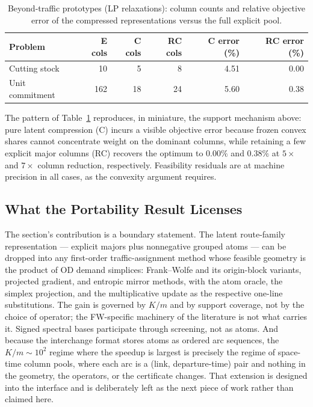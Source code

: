 \begin{table}[htbp]
\centering
\caption{Beyond-traffic prototypes (LP relaxations): column counts and
relative objective error of the compressed representations versus the full
explicit pool.}
\label{tab:beyond-traffic}
\begin{tabular}{lrrrrr}
\toprule
Problem & E cols & C cols & RC cols & C error (\%) & RC error (\%) \\
\midrule
Cutting stock   & 10  & 5  & 8  & 4.51 & 0.00 \\
Unit commitment & 162 & 18 & 24 & 5.60 & 0.38 \\
\bottomrule
\end{tabular}
\end{table}

The pattern of Table~\ref{tab:beyond-traffic} reproduces, in miniature, the
support mechanism above: pure latent
compression (C) incurs a visible objective error because frozen convex shares
cannot concentrate weight on the dominant columns, while retaining a few
explicit major columns (RC) recovers the optimum to $0.00\%$ and $0.38\%$ at
$5\times$ and $7\times$ column reduction, respectively. Feasibility residuals
are at machine precision in all cases, as the convexity argument requires.

\subsection{What the Portability Result Licenses}
\label{sec:portability-conclusions}

The section's contribution is a boundary statement. The latent
route-family representation --- explicit majors plus nonnegative grouped
atoms --- can be dropped into any first-order traffic-assignment method
whose feasible geometry is the product of OD demand simplices:
Frank--Wolfe and its origin-block variants, projected gradient, and
entropic mirror methods, with the atom oracle, the simplex projection,
and the multiplicative update as the respective one-line substitutions.
The gain is governed by $K/m$ and by support coverage, not by the choice
of operator; the FW-specific machinery of the literature is not what
carries it. Signed spectral bases participate through screening, not as
atoms. And because the interchange format stores atoms as ordered arc
sequences, the $K/m \sim 10^2$ regime where the speedup is largest is
precisely the regime of space-time column pools, where each arc is a
(link, departure-time) pair and nothing in the geometry, the operators,
or the certificate changes. That extension is designed into the
interface and is deliberately left as the next piece of work rather
than claimed here.

